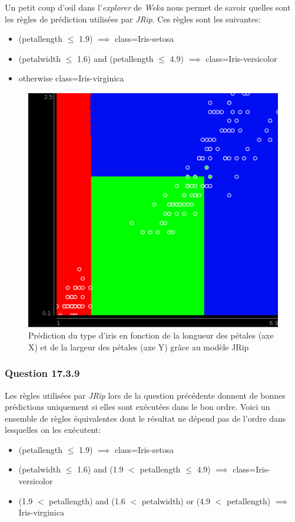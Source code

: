 \documentclass[10pt,a4paper]{article}
\begin{document}
			Un petit coup d'œil dans l'\textit{explorer} de \textit{Weka} nous permet de savoir quelles sont les règles de prédiction utilisées par \textit{JRip}. Ces règles sont les suivantes:
			
			\begin{itemize}
				\item (petallength $\le$ 1.9) $\implies$ class=Iris-setosa
				\item (petalwidth $\le$ 1.6) and (petallength $\le$ 4.9) $\implies$ class=Iris-versicolor
				\item otherwise class=Iris-virginica
			\end{itemize}   
			
			\begin{figure}[h]
				\centering
				\includegraphics[width=.5\textwidth]{iris_JRip}
				\caption{Prédiction du type d'iris en fonction de la longueur des pétales (axe X) et de la largeur des pétales (axe Y) grâce au modèle JRip}
				\label{fig:iris:JRip}
			\end{figure}
			
			\subsubsection*{Question 17.3.9}
			
			Les règles utilisées par \textit{JRip} lors de la question précédente donnent de bonnes prédictions uniquement si elles sont exécutées dans le bon ordre. Voici un ensemble de règles équivalentes dont le résultat ne dépend pas de l'ordre dans lesquelles on les exécutent:
			
			\begin{itemize}
				\item (petallength $\le$ 1.9) $\implies$ class=Iris-setosa
				\item (petalwidth $\le$ 1.6) and (1.9 $<$ petallength $\le$ 4.9) $\implies$ class=Iris-versicolor
				\item (1.9 $<$ petallength) and (1.6 $<$ petalwidth) or (4.9 $<$ petallength) $\implies$ Iris-virginica
			\end{itemize}
			
\end{document}
